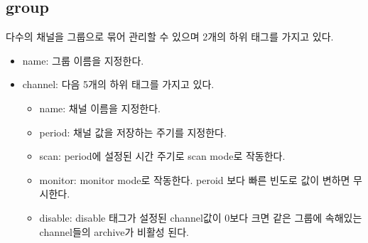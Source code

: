 \documentclass[11pt
  , a4paper
  , article
  , oneside
]{memoir}
\begin{document}
\subsection{group}
다수의 채널을 그룹으로 묶어 관리할 수 있으며 2개의 하위 태그를 가지고 있다.
\begin{itemize}
\item name: 그룹 이름을 지정한다.
\item channel: 다음 5개의 하위 태그를 가지고 있다.
\begin{itemize}
\item name: 채널 이름을 지정한다.
\item period: 채널 값을 저장하는 주기를 지정한다.
\item scan: period에 설정된 시간 주기로 scan mode로 작동한다.
\item monitor: monitor mode로 작동한다. peroid 보다 빠른 빈도로 값이 변하면 무시한다.
\item disable: disable 태그가 설정된 channel값이 0보다 크면 같은 그룹에 속해있는 channel들의 archive가 비활성 된다.
\end{itemize}
\end{itemize}
\end{document}
